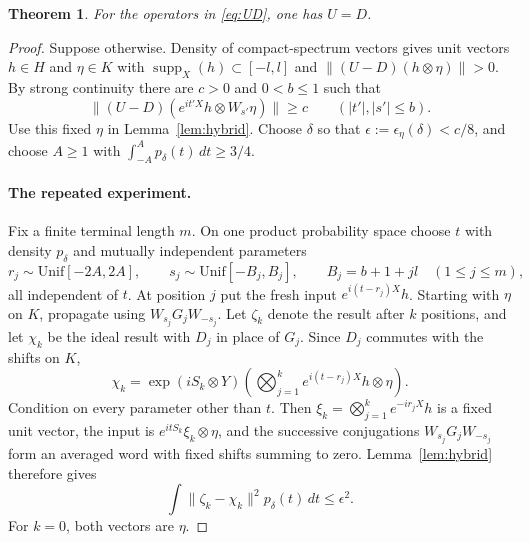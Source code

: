 \documentclass[11pt]{article}
\newtheorem{theorem}{Theorem}[section]
\theoremstyle{definition}
\DeclareMathOperator{\supp}{supp}
\begin{document}
\begin{theorem}\label{thm:UD}
For the operators in \eqref{eq:UD}, one has $U=D$.
\end{theorem}
\begin{proof}
Suppose otherwise. Density of compact-spectrum vectors gives unit vectors
$h\in H$ and $\eta\in K$ with $\supp_X(h)\subset[-l,l]$ and
$\|(U-D)(h\otimes\eta)\|>0$. By strong continuity there are $c>0$ and
$0<b\le1$ such that
\begin{equation}\label{eq:localgap}
 \|(U-D)(e^{it'X}h\otimes W_{s'}\eta)\|\ge c
 \qquad(|t'|,|s'|\le b).
\end{equation}
Use this fixed $\eta$ in Lemma~\ref{lem:hybrid}. Choose $\delta$ so that
$\epsilon:=\epsilon_\eta(\delta)<c/8$, and choose $A\ge1$ with
$\int_{-A}^A p_\delta(t)\,dt\ge3/4$.

\paragraph{The repeated experiment.}
Fix a finite terminal length $m$. On one product probability space choose
$t$ with density $p_\delta$ and mutually independent parameters
\[
 r_j\sim\mathrm{Unif}[-2A,2A],\qquad
 s_j\sim\mathrm{Unif}[-B_j,B_j],\qquad B_j=b+1+jl
 \quad(1\le j\le m),
\]
all independent of $t$.
At position $j$ put the fresh input $e^{i(t-r_j)X}h$. Starting with $\eta$
on $K$, propagate using $W_{s_j}G_jW_{-s_j}$. Let $\zeta_k$ denote the
result after $k$ positions, and let $\chi_k$ be the ideal result with $D_j$
in place of $G_j$. Since $D_j$ commutes with the shifts on $K$,
\[
 \chi_k=\exp(iS_k\otimes Y)
   \left(\bigotimes_{j=1}^k e^{i(t-r_j)X}h\otimes\eta\right).
\]
Condition on every parameter other than $t$. Then
$\xi_k=\bigotimes_{j=1}^k e^{-ir_jX}h$ is a fixed unit vector, the input
is $e^{itS_k}\xi_k\otimes\eta$, and the successive conjugations
$W_{s_j}G_jW_{-s_j}$ form an averaged word with fixed shifts summing to zero.
Lemma~\ref{lem:hybrid} therefore gives
\begin{equation}\label{eq:idealclose}
 \int\|\zeta_k-\chi_k\|^2p_\delta(t)\,dt\le\epsilon^2.
\end{equation}
For $k=0$, both vectors are $\eta$.


\end{proof}
\end{document}
